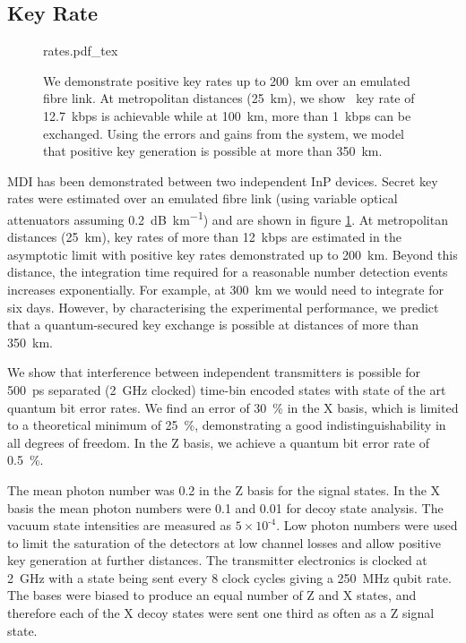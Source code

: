\subsection{Key Rate}

\begin{figure}[tbp]
	\centering
	\small
	\def\svgwidth{0.9\textwidth} 
	{rates.pdf_tex}
	\caption[Asymptotic key rates of chip-based MDI-QKD]{We demonstrate positive key rates up to \SI{200}{\km} over an emulated fibre link. At metropolitan distances (\SI{25}{\km}), we show \ key rate of \SI{12.7}{kbps} is achievable while at \SI{100}{\km}, more than \SI{1}{kbps} can be exchanged. Using the errors and gains from the system, we model that positive key generation is possible at more than \SI{350}{\km}.}
	\label{fig:mdi_rates}
\end{figure}

\Ac{MDI} has been demonstrated between two independent InP devices. Secret key rates were estimated over an emulated fibre link (using variable optical attenuators assuming \SI{0.2}{dB\per\km}) and are shown in figure \ref{fig:mdi_rates}. At metropolitan distances (\SI{25}{\km}), key rates of more than \SI{12}{kbps} are estimated in the asymptotic limit with positive key rates demonstrated up to \SI{200}{\km}. Beyond this distance, the integration time required for a reasonable number detection events increases exponentially. For example, at \SI{300}{\km} we would need to integrate for six days. However, by characterising the experimental performance, we predict that a quantum-secured key exchange is possible at distances of more than \SI{350}{\km}. 

We show that interference between independent transmitters is possible for \SI{500}{ps} separated (\SI{2}{GHz} clocked) time-bin encoded states with state of the art quantum bit error rates. We find an error of \SI{30}{\percent} in the X basis, which is limited to a theoretical minimum of \SI{25}{\percent}, demonstrating a good indistinguishability in all degrees of freedom. In the Z basis, we achieve a quantum bit error rate of \SI{0.5}{\percent}. 

The mean photon number was 0.2 in the Z basis for the signal states. In the X basis the mean photon numbers were 0.1 and 0.01 for decoy state analysis. The vacuum state intensities are measured as $\text{5}\times \text{10}^\text{-4}$. Low photon numbers were used to limit the saturation of the detectors at low channel losses and allow positive key generation at further distances. The transmitter electronics is clocked at \SI{2}{GHz} with a state being sent every 8 clock cycles giving a \SI{250}{MHz} qubit rate. The bases were biased to produce an equal number of Z and X states, and therefore each of the X decoy states were sent one third as often as a Z signal state.

